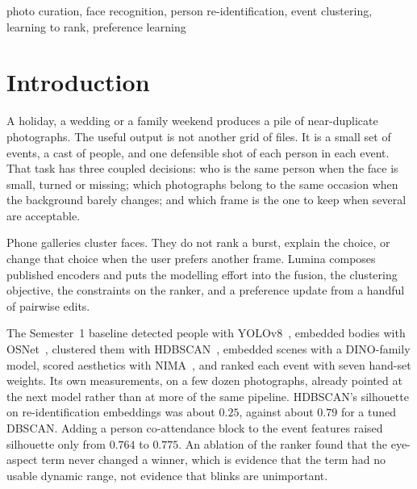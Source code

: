 \documentclass[conference]{IEEEtran}
\begin{document}
\begin{IEEEkeywords}
photo curation, face recognition, person re-identification, event clustering,
learning to rank, preference learning
\end{IEEEkeywords}

\section{Introduction}
\label{sec:intro}

A holiday, a wedding or a family weekend produces a pile of near-duplicate
photographs. The useful output is not another grid of files. It is a small set
of events, a cast of people, and one defensible shot of each person in each
event. That task has three coupled decisions: who is the same person when the
face is small, turned or missing; which photographs belong to the same
occasion when the background barely changes; and which frame is the one to
keep when several are acceptable.

Phone galleries cluster faces. They do not rank a burst, explain the choice,
or change that choice when the user prefers another frame. Lumina composes
published encoders and puts the modelling effort into the fusion, the
clustering objective, the constraints on the ranker, and a preference update
from a handful of pairwise edits.

The Semester~1 baseline detected people with YOLOv8~\cite{jocher2023yolov8},
embedded bodies with OSNet~\cite{zhou2019osnet}, clustered them with
HDBSCAN~\cite{mcinnes2017hdbscan}, embedded scenes with a DINO-family
model, scored aesthetics with NIMA~\cite{talebi2018nima}, and ranked each
event with seven hand-set weights. Its own measurements, on a few dozen
photographs, already pointed at the next model rather than at more of the same
pipeline. HDBSCAN's silhouette on re-identification embeddings was about
$0.25$, against about $0.79$ for a tuned DBSCAN. Adding a person
co-attendance block to the event features raised silhouette only from $0.764$
to $0.775$. An ablation of the ranker found that the eye-aspect term never
changed a winner, which is evidence that the term had no usable dynamic range,
not evidence that blinks are unimportant.
\end{document}
